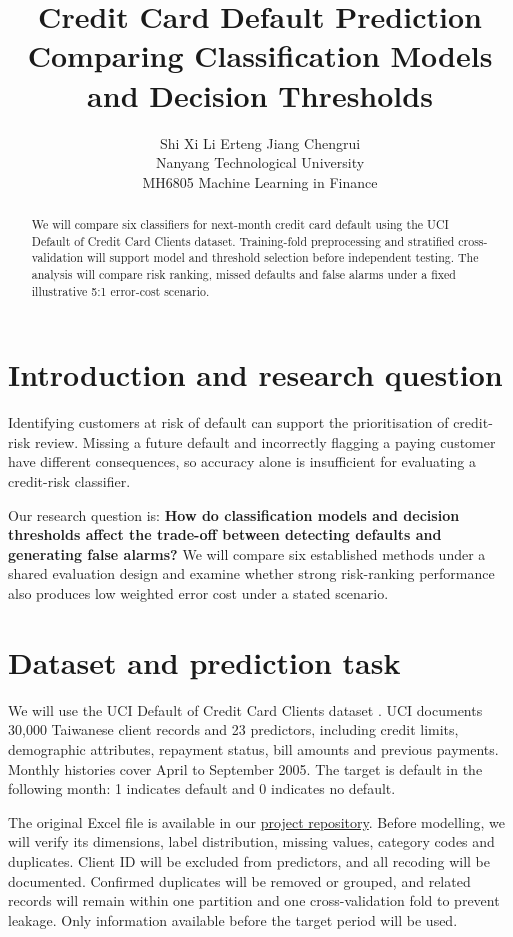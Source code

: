 \documentclass{article}
\title{Credit Card Default Prediction\\Comparing Classification Models\\and Decision Thresholds}
\author{%
  Shi Xi \qquad Li Erteng \qquad Jiang Chengrui\\
  Nanyang Technological University\\
  MH6805 Machine Learning in Finance
}
\date{}
\begin{document}
\maketitle
\thispagestyle{plain}

\begin{abstract}
We will compare six classifiers for next-month credit card default using the UCI Default of Credit Card Clients dataset. Training-fold preprocessing and stratified cross-validation will support model and threshold selection before independent testing. The analysis will compare risk ranking, missed defaults and false alarms under a fixed illustrative 5:1 error-cost scenario.
\end{abstract}

\section{Introduction and research question}
Identifying customers at risk of default can support the prioritisation of credit-risk review. Missing a future default and incorrectly flagging a paying customer have different consequences, so accuracy alone is insufficient for evaluating a credit-risk classifier.

Our research question is: \textbf{How do classification models and decision thresholds affect the trade-off between detecting defaults and generating false alarms?} We will compare six established methods under a shared evaluation design and examine whether strong risk-ranking performance also produces low weighted error cost under a stated scenario.

\section{Dataset and prediction task}
We will use the UCI Default of Credit Card Clients dataset \citep{uci_default}. UCI documents 30,000 Taiwanese client records and 23 predictors, including credit limits, demographic attributes, repayment status, bill amounts and previous payments. Monthly histories cover April to September 2005. The target is default in the following month: 1 indicates default and 0 indicates no default.

The original Excel file is available in our \href{https://github.com/ishixi233/Credit-MLoF}{project repository}. Before modelling, we will verify its dimensions, label distribution, missing values, category codes and duplicates. Client ID will be excluded from predictors, and all recoding will be documented. Confirmed duplicates will be removed or grouped, and related records will remain within one partition and one cross-validation fold to prevent leakage. Only information available before the target period will be used.
\end{document}
